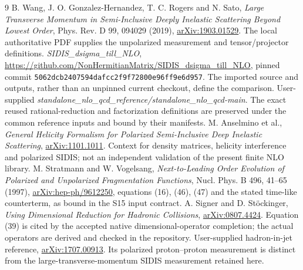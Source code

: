 \documentclass[11pt,a4paper]{article}
\newcommand{\code}[1]{{\small\nolinkurl{#1}}}
\begin{document}
\begin{thebibliography}{9}
 B. Wang, J. O. Gonzalez-Hernandez, T. C. Rogers and N. Sato,
\emph{Large Transverse Momentum in Semi-Inclusive Deeply Inelastic Scattering Beyond Lowest Order},
Phys. Rev. D 99, 094029 (2019), \href{https://arxiv.org/abs/1903.01529}{arXiv:1903.01529}.
The local authoritative PDF supplies the unpolarized measurement and tensor/projector definitions.
 \emph{SIDIS\_dsigma\_till\_NLO},
\url{https://github.com/NonHermitianMatrix/SIDIS_dsigma_till_NLO},
pinned commit \code{5062dcb2407594dafcc2f9f72800e96ff9e6d957}.
The imported source and outputs, rather than an unpinned current checkout, define the comparison.
 User-supplied \emph{standalone\_nlo\_qcd\_reference/standalone\_nlo\_qcd-main}.
The exact reused rational-reduction and factorization definitions are preserved under the common reference inputs and bound by their manifests.
 M. Anselmino et al., \emph{General Helicity Formalism for Polarized Semi-Inclusive Deep Inelastic Scattering},
\href{https://arxiv.org/abs/1101.1011}{arXiv:1101.1011}.
Context for density matrices, helicity interference and polarized SIDIS; not an independent validation of the present finite NLO library.
 M. Stratmann and W. Vogelsang,
\emph{Next-to-Leading Order Evolution of Polarized and Unpolarized Fragmentation Functions},
Nucl. Phys. B 496, 41--65 (1997),
\href{https://arxiv.org/abs/hep-ph/9612250}{arXiv:hep-ph/9612250},
equations (16), (46), (47) and the stated time-like counterterm, as bound in the S15 input contract.
 A. Signer and D. St\"ockinger,
\emph{Using Dimensional Reduction for Hadronic Collisions},
\href{https://arxiv.org/abs/0807.4424}{arXiv:0807.4424}.
Equation (39) is cited by the accepted native dimensional-operator completion; the actual operators are derived and checked in the repository.
 User-supplied hadron-in-jet reference,
\href{https://arxiv.org/abs/1707.00913}{arXiv:1707.00913}.
Its polarized proton--proton measurement is distinct from the large-transverse-momentum SIDIS measurement retained here.
\end{thebibliography}
\end{document}
